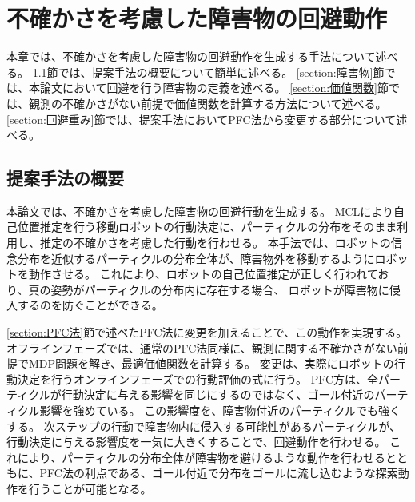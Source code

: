 \chapter{不確かさを考慮した障害物の回避動作} \label{chapter:method}
本章では、不確かさを考慮した障害物の回避動作を生成する手法について述べる。
\ref{section:method overview}節では、提案手法の概要について簡単に述べる。
\ref{section:障害物}節では、本論文において回避を行う障害物の定義を述べる。
\ref{section:価値関数}節では、観測の不確かさがない前提で価値関数を計算する方法について述べる。
\ref{section:回避重み}節では、提案手法においてPFC法から変更する部分について述べる。

\newpage


\section{提案手法の概要} \label{section:method overview}
本論文では、不確かさを考慮した障害物の回避行動を生成する。
MCLにより自己位置推定を行う移動ロボットの行動決定に、パーティクルの分布をそのまま利用し、推定の不確かさを考慮した行動を行わせる。
本手法では、ロボットの信念分布を近似するパーティクルの分布全体が、障害物外を移動するようにロボットを動作させる。
これにより、ロボットの自己位置推定が正しく行われており、真の姿勢がパーティクルの分布内に存在する場合、
ロボットが障害物に侵入するのを防ぐことができる。



\ref{section:PFC法}節で述べたPFC法に変更を加えることで、この動作を実現する。
オフラインフェーズでは、通常のPFC法同様に、観測に関する不確かさがない前提でMDP問題を解き、最適価値関数を計算する。
変更は、実際にロボットの行動決定を行うオンラインフェーズでの行動評価の式に行う。
PFC方は、全パーティクルが行動決定に与える影響を同じにするのではなく、ゴール付近のパーティクル影響を強めている。
この影響度を、障害物付近のパーティクルでも強くする。
次ステップの行動で障害物内に侵入する可能性があるパーティクルが、行動決定に与える影響度を一気に大きくすることで、回避動作を行わせる。
これにより、パーティクルの分布全体が障害物を避けるような動作を行わせるとともに、PFC法の利点である、ゴール付近で分布をゴールに流し込むような探索動作を行うことが可能となる。


